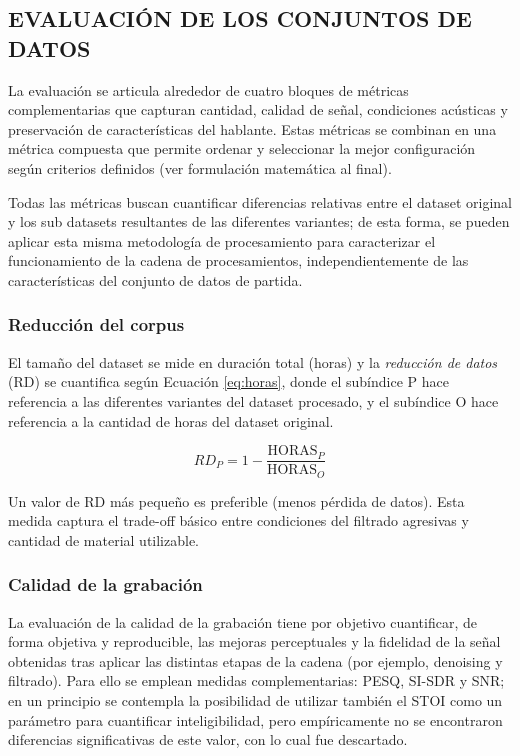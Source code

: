 \subsection{EVALUACIÓN DE LOS CONJUNTOS DE DATOS}
\label{sec:metricas_description}

La evaluación se articula alrededor de cuatro bloques de métricas complementarias que capturan cantidad, calidad de señal, condiciones acústicas y preservación de características del hablante. Estas métricas se combinan en una métrica compuesta que permite ordenar y seleccionar la mejor configuración según criterios definidos (ver formulación matemática al final). 

Todas las métricas buscan cuantificar diferencias relativas entre el dataset original y los sub datasets resultantes de las diferentes variantes; de esta forma, se pueden aplicar esta misma metodología de procesamiento para caracterizar el funcionamiento de la cadena de procesamientos, independientemente de las características del conjunto de datos de partida.

\subsubsection{Reducción del corpus}
El tamaño del dataset se mide en duración total (horas) y la \emph{reducción de datos} (RD) se cuantifica según Ecuación \ref{eq:horas}, donde el subíndice P hace referencia a las diferentes variantes del dataset procesado, y el subíndice O hace referencia a la cantidad de horas del dataset original.


\begin{equation}
\label{eq:horas}
RD_P = 1 - \frac{\mathrm{HORAS}_P}{\mathrm{HORAS}_O}
\end{equation}

Un valor de RD más pequeño es preferible (menos pérdida de datos). Esta medida captura el trade-off básico entre condiciones del filtrado agresivas y cantidad de material utilizable. 

\subsubsection{Calidad de la grabación}
La evaluación de la calidad de la grabación tiene por objetivo cuantificar, de forma objetiva y reproducible, las mejoras perceptuales y la fidelidad de la señal obtenidas tras aplicar las distintas etapas de la cadena (por ejemplo, denoising y filtrado). Para ello se emplean medidas complementarias: PESQ, SI-SDR y SNR; en un principio se contempla la posibilidad de utilizar también el STOI como un parámetro para cuantificar inteligibilidad, pero empíricamente no se encontraron diferencias significativas de este valor, con lo cual fue descartado. 

